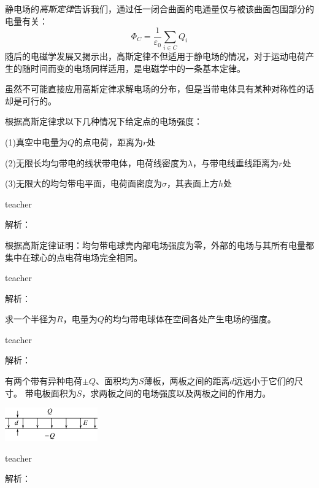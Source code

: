 静电场的\emph{高斯定律}告诉我们，通过任一闭合曲面的电通量仅与被该曲面包围部分的电量有关：
\begin{equation}
\Phi_C = \frac{1}{\varepsilon_0}\sum_{i\in C}Q_i
\end{equation}
随后的电磁学发展又揭示出，高斯定律不但适用于静电场的情况，对于运动电荷产生的随时间而变的电场同样适用，是电磁学中的一条基本定律。

虽然不可能直接应用高斯定律求解电场的分布，但是当带电体具有某种对称性的话却是可行的。

\begin{example}
根据高斯定律求以下几种情况下给定点的电场强度：

(1)真空中电量为$Q$的点电荷，距离为$r$处

(2)无限长均匀带电的线状带电体，电荷线密度为$\lambda$，与带电线垂线距离为$r$处

(3)无限大的均匀带电平面，电荷面密度为$\sigma$，其表面上方$h$处
\begin{taggedblock}{teacher}

解析：
\end{taggedblock}
\end{example}

\begin{example}
根据高斯定律证明：均匀带电球壳内部电场强度为零，外部的电场与其所有电量都集中在球心的点电荷电场完全相同。
\begin{taggedblock}{teacher}

解析：
\end{taggedblock}
\end{example}

\begin{example}
求一个半径为$R$，电量为$Q$的均匀带电球体在空间各处产生电场的强度。
\begin{taggedblock}{teacher}

解析：
\end{taggedblock}
\end{example}




\begin{example}
有两个带有异种电荷$\pm Q$、面积均为$S$薄板，两板之间的距离$d$远远小于它们的尺寸。
带电板面积为$S$，求两板之间的电场强度以及两板之间的作用力。
\begin{flushright}
\includegraphics[width=0.3\textwidth]{images/elec-problem-4.pdf}
\end{flushright}
\begin{taggedblock}{teacher}

解析：
\end{taggedblock}
\end{example}

